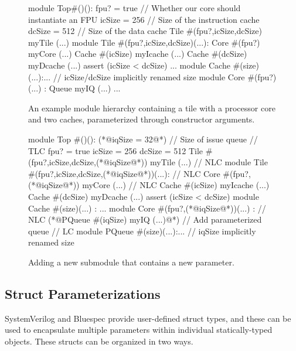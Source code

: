 \begin{figure}
\centering
\begin{phdl}
module Top#()():
  fpu? = true    // Whether our core should instantiate an FPU
  icSize = 256   // Size of the instruction cache
  dcSize = 512   // Size of the data cache
  Tile #(fpu?,icSize,dcSize) myTile (...)
module Tile #(fpu?,icSize,dcSize)(...):
  Core  #(fpu?) myCore (...)
  Cache #(icSize) myIcache (...)
  Cache #(dcSize) myDcache (...)
  assert (icSize < dcSize) ...
module Cache #(size)(...):... // icSize/dcSize implicitly renamed size
module Core #(fpu?)(...) :
  Queue myIQ (...) ...
\end{phdl} 
\caption{An example module hierarchy containing a tile with a processor core and two caches, parameterized through constructor arguments.}
\label{fig:arglist}
\end{figure}

\begin{figure}
\centering
\begin{phdl}
module Top #()():
  (*@\textcolor[rgb]{1,0,0}{iqSize = 32}@*)  // Size of issue queue                            // TLC
  fpu? = true
  icSize = 256 
  dcSize = 512
  Tile #(fpu?,icSize,dcSize,(*@\textcolor[rgb]{1,0,0}{iqSize}@*)) myTile (...)                 // NLC
module Tile #(fpu?,icSize,dcSize,(*@\textcolor[rgb]{1,0,0}{iqSize}@*))(...):                   // NLC
  Core #(fpu?,(*@\textcolor[rgb]{1,0,0}{iqSize}@*)) myCore (...)                               // NLC
  Cache #(icSize) myIcache (...)
  Cache #(dcSize) myDcache (...)
  assert (icSize < dcSize)
module Cache #(size)(...) : ... 
module Core #(fpu?,(*@\textcolor[rgb]{1,0,0}{iqSize}@*))(...) :                                // NLC
  (*@\textcolor[rgb]{1,0,0}{PQueue \#(iqSize) myIQ (...)}@*)  // Add parameterized queue        // LC
module PQueue #(size)(...):... // iqSize implicitly renamed size
\end{phdl}
\caption{Adding a new submodule that contains a new parameter.}
\label{fig:arglist-delta}
\end{figure}

\subsection{Struct Parameterizations}

SystemVerilog and Bluespec provide user-defined struct types, and these can be used to encapsulate multiple parameters within individual statically-typed objects. These structs can be organized in two ways.


